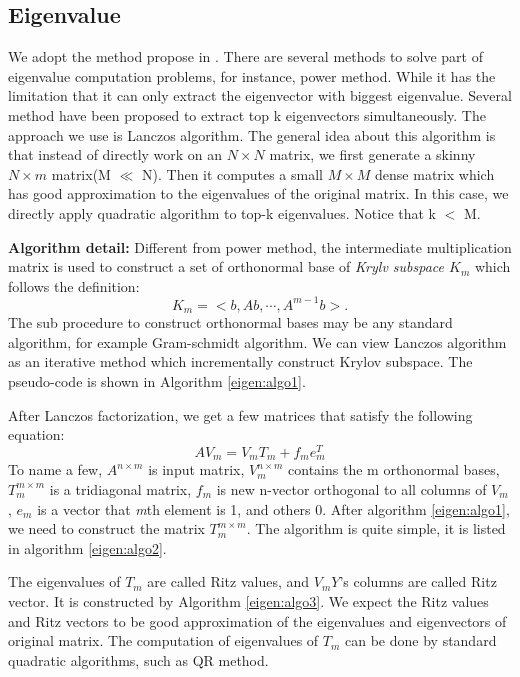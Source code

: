 \subsection{Eigenvalue}
We adopt the method propose in \cite{kang2011spectral}. There are several methods to solve part of eigenvalue computation problems, for instance, power method\cite{langville2004deeper}. While it has the limitation that it can only extract the eigenvector with biggest eigenvalue. Several method have been proposed to extract top k eigenvectors simultaneously. The approach we use is Lanczos algorithm\cite{lanczos1950iteration}. The general idea about this algorithm is that instead of directly work on an $N \times N$ matrix, we first generate a skinny $N \times m$ matrix(M $\ll$ N). Then it computes a small $M \times M$ dense matrix which has good approximation to the eigenvalues of the original matrix. In this case, we directly apply quadratic algorithm to top-k eigenvalues. Notice that k $<$ M.

{\bf{Algorithm detail:}} Different from power method, the intermediate multiplication matrix is used to construct a set of orthonormal base of \emph{Krylv subspace $K_{m}$} which follows the definition:
\begin{equation}
K_{m} = < b, Ab, \cdots, A^{m-1}b>.
\end{equation}
The sub procedure to construct orthonormal bases may be any standard algorithm, for example Gram-schmidt algorithm. We can view Lanczos algorithm as an iterative method which incrementally construct Krylov subspace. The pseudo-code is shown in Algorithm \ref{eigen:algo1}.

After Lanczos factorization, we get a few matrices that satisfy the following equation:
\begin{equation}
	AV_{m} = V_{m}T_{m} + f_{m}e^{T}_{m}
\end{equation}
To name a few, $A^{n\times m}$ is input matrix, $V^{n\times m}_{m}$ contains the m orthonormal bases, $T^{m\times m}_{m}$ is a tridiagonal matrix, $f_{m}$ is new n-vector orthogonal to all columns of $V_{m}$, $
e_{m}$ is a vector that \emph{m}th element is 1, and others 0. After algorithm \ref{eigen:algo1}, we need to construct the matrix $T^{m\times m}_{m}$. The algorithm is quite simple, it is listed in algorithm \ref{eigen:algo2}. 

The eigenvalues of $T_{m}$ are called Ritz values, and $V_{m}Y$'s columns are called Ritz vector. It is constructed by Algorithm \ref{eigen:algo3}. We expect the Ritz values and Ritz vectors to be good approximation of the eigenvalues and eigenvectors of original matrix. The computation of eigenvalues of $T_{m}$ can be done by standard quadratic algorithms, such as QR method. 

